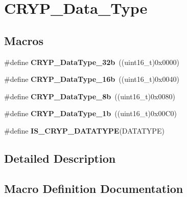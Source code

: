 \hypertarget{group___c_r_y_p___data___type}{}\section{C\+R\+Y\+P\+\_\+\+Data\+\_\+\+Type}
\label{group___c_r_y_p___data___type}
\subsection*{Macros}
\begin{DoxyCompactItemize}
\item 
\hypertarget{group___c_r_y_p___data___type_gae15c7cabc8c325af4d547614ff24e2d8}{}\#define {\bfseries C\+R\+Y\+P\+\_\+\+Data\+Type\+\_\+32b}~((uint16\+\_\+t)0x0000)\label{group___c_r_y_p___data___type_gae15c7cabc8c325af4d547614ff24e2d8}

\item 
\hypertarget{group___c_r_y_p___data___type_ga6af3c4d9f6f8c2b8cbf86c640fd053a7}{}\#define {\bfseries C\+R\+Y\+P\+\_\+\+Data\+Type\+\_\+16b}~((uint16\+\_\+t)0x0040)\label{group___c_r_y_p___data___type_ga6af3c4d9f6f8c2b8cbf86c640fd053a7}

\item 
\hypertarget{group___c_r_y_p___data___type_ga6f4f176ec21c1670ae7a1af03e714367}{}\#define {\bfseries C\+R\+Y\+P\+\_\+\+Data\+Type\+\_\+8b}~((uint16\+\_\+t)0x0080)\label{group___c_r_y_p___data___type_ga6f4f176ec21c1670ae7a1af03e714367}

\item 
\hypertarget{group___c_r_y_p___data___type_gacc3a4c23852b4f4f647b6923d7384875}{}\#define {\bfseries C\+R\+Y\+P\+\_\+\+Data\+Type\+\_\+1b}~((uint16\+\_\+t)0x00\+C0)\label{group___c_r_y_p___data___type_gacc3a4c23852b4f4f647b6923d7384875}

\item 
\#define {\bfseries I\+S\+\_\+\+C\+R\+Y\+P\+\_\+\+D\+A\+T\+A\+T\+Y\+P\+E}(D\+A\+T\+A\+T\+Y\+P\+E)
\end{DoxyCompactItemize}


\subsection{Detailed Description}


\subsection{Macro Definition Documentation}
\hypertarget{group___c_r_y_p___data___type_ga4933d85931b7b8d0b290a1025a666486}{}
